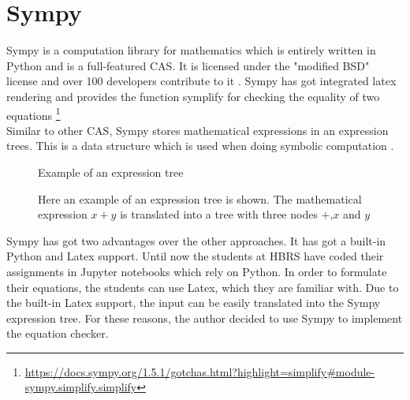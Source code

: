     \section{Sympy}
    Sympy is a computation library for mathematics which is entirely written in Python and is a full-featured \ac{CAS}\cite[p.~2]{Meurer2017a}.
    It is licensed under the "modified BSD" license \cite[p.~225]{10.1145/2110170.2110185} and over 100 developers
    contribute to it \cite[p.~226]{10.1145/2110170.2110185}. Sympy has got integrated latex rendering \cite[p.~226]{10.1145/2110170.2110185} and
    provides the function symplify for checking the equality of two equations \footnote{\url{https://docs.sympy.org/1.5.1/gotchas.html?highlight=simplify\#module-sympy.simplify.simplify}}\\
    Similar to other \ac{CAS}, Sympy stores mathematical expressions in an expression trees. This is a data structure which is used when doing symbolic
    computation \cite[p.18]{Meurer2017a}.
    \begin{figure}[h]
        \centering
        
        \caption{Example of an expression tree}
        \caption*{Here an example of an expression tree is shown. The mathematical expression $x+y$ is translated into a tree with three nodes $+$,$x$ and $y$}
    \end{figure}
    Sympy has got two advantages over the other approaches. It has got a built-in Python and Latex support. Until now the students at HBRS have coded their assignments in Jupyter
    notebooks which rely on Python. In order to formulate their equations, the students can use Latex, which they are familiar with. Due to the built-in Latex
    support, the input can be easily translated into the Sympy expression tree. For these reasons, the author decided to use Sympy to implement the equation checker.
